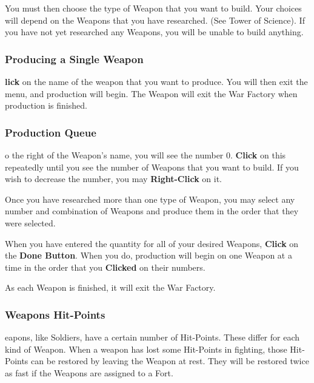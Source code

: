 
You must then choose the type of Weapon that you want to build. Your choices will depend on the Weapons that you have researched. (See Tower of Science). If you have not yet researched any Weapons, you will be unable to build anything.

\subsubsection{\textsf{Producing a Single Weapon}}

\textbf{lick} on the name of the weapon that you want to produce. You will then exit the menu, and production will begin. The Weapon will exit the War Factory when production is finished.

\subsubsection{\textsf{Production Queue}}

o the right of the Weapon’s name, you will see the number 0. \textbf{Click} on this repeatedly until you see the number of Weapons that you want to build. If you wish to decrease the number, you may \textbf{Right-Click} on it.

Once you have researched more than one type of Weapon, you may select any number and combination of Weapons and produce them in the order that they were selected.

When you have entered the quantity for all of your desired Weapons, \textbf{Click} on the \textbf{Done Button}. When you do, production will begin on one Weapon at a time in the order that you \textbf{Clicked} on their numbers.

As each Weapon is finished, it will exit the War Factory.

\subsubsection{\textsf{Weapons Hit-Points}}



eapons, like Soldiers, have a certain number of Hit-Points. These differ for each kind of Weapon. When a weapon has lost some Hit-Points in fighting, those Hit-Points can be restored by leaving the Weapon at rest. They will be restored twice as fast if the Weapons are assigned to a Fort.

